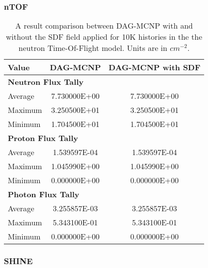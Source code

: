 \subsubsection{nTOF}

\begin{table}[H]
  \small
  \begin{center}
    \begin{tabular}{lcc}
          \toprule
          Value   & DAG-MCNP     & DAG-MCNP with SDF      \\
          \toprule
          \multicolumn{3}{l}{\textbf{Neutron Flux Tally}} \\
          Average & 7.730000E+00 & 7.730000E+00           \\
          Maximum & 3.250500E+01 & 3.250500E+01           \\
          Minimum & 1.704500E+01 & 1.704500E+01           \\
          \multicolumn{3}{l}{\textbf{Proton Flux Tally}}  \\
          Average & 1.539597E-04 & 1.539597E-04           \\
          Maximum & 1.045990E+00 & 1.045990E+00           \\
          Minimum & 0.000000E+00 & 0.000000E+00           \\
          \multicolumn{3}{l}{\textbf{Photon Flux Tally}}  \\
          Average & 3.255857E-03 & 3.255857E-03           \\
          Maximum & 5.343100E-01 & 5.343100E-01           \\
          Minimum & 0.000000E+00 & 0.000000E+00           \\
          \bottomrule
    \end{tabular}
  \end{center}
  \caption[Results of flux mesh tallies for several particle types in the nTOF
    model.]{A result comparison between DAG-MCNP with and without the SDF field
    applied for 10K histories in the the neutron Time-Of-Flight model. Units are
    in $cm^{-2}$.}
\end{table}

\subsubsection{SHINE}

